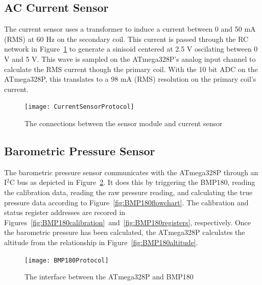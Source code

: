 		\subsection{AC Current Sensor}
			The current sensor uses a transformer to induce a current between 0 and 50 mA (RMS) at 60 Hz on the secondary coil. This current is passed through the RC network in Figure~\ref{fig:CurrentSensorProtocol} to generate a sinisoid centered at 2.5 V oscilating between 0 V and 5 V. This wave is sampled on the ATmega328P's analog input channel to calculate the RMS current though the primary coil. With the 10 bit ADC on the ATmega328P, this translates to a 98 mA (RMS) resolution on the primary coil's current.
				\begin{figure}[h!]
					\centering
					\texttt{[image: CurrentSensorProtocol]}
					\caption{The connections between the sensor module and current sensor}
					\label{fig:CurrentSensorProtocol}
				\end{figure}
		
		
		\subsection{Barometric Pressure Sensor}
			The barometric pressure sensor communicates with the ATmega328P through an I$^2$C bus as depicted in Figure~\ref{fig:BMP180protocol}. It does this by triggering the BMP180, reading the calibration data, reading the raw pressure reading, and calculating the true pressure data according to Figure~\ref{fig:BMP180flowchart}. The calibration and status register addresses are recored in Figures~\ref{fig:BMP180calibration}~and~\ref{fig:BMP180registers}, respectively. Once the barometric pressure has been calculated, the ATmega328P calculates the altitude from the relationship in Figure~\ref{fig:BMP180altitude}.
			
			\begin{figure}[h!]
				\centering
				\texttt{[image: BMP180Protocol]}
				\caption{The interface between the ATmega328P and BMP180}
				\label{fig:BMP180protocol}
			\end{figure}
			
